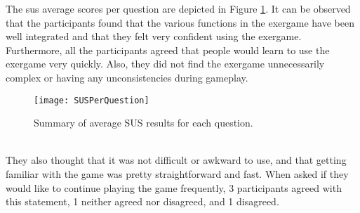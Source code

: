 The \acrshort{sus} average scores per question are depicted in Figure \ref{fig:susPerQuestion}. It can be observed that the participants found that the various functions in the exergame have been well integrated and that they felt very confident using the exergame. Furthermore, all the participants agreed that people would learn to use the exergame very quickly. Also, they did not find the exergame unnecessarily complex or having any unconsistencies during gameplay.\\
\begin{figure}[h]
    \centering
    \texttt{[image: SUSPerQuestion]}
    \caption{Summary of average SUS results for each question.}
    \label{fig:susPerQuestion}
\end{figure}\\ They also thought that it was not difficult or awkward to use, and that getting familiar with the game was pretty straightforward and fast. When asked if they would like to continue playing the game frequently, 3 participants agreed with this statement, 1  neither agreed nor disagreed, and 1 disagreed. 

